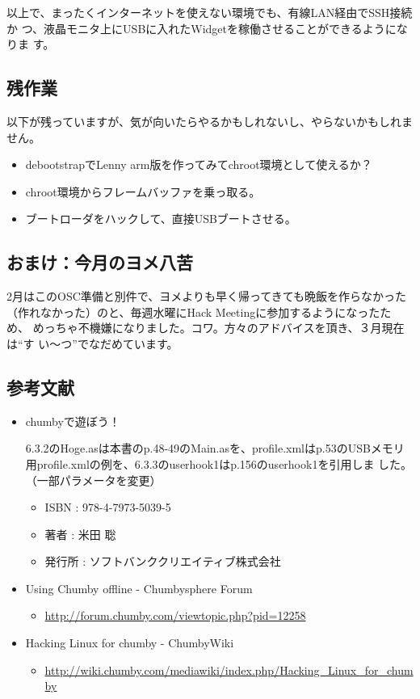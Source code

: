 \documentclass[mingoth,a4paper]{jsarticle}
\begin{document}
\begin{multicols}{2}
以上で、まったくインターネットを使えない環境でも、有線LAN経由でSSH接続か
つ、液晶モニタ上にUSBに入れたWidgetを稼働させることができるようになりま
す。
\subsection{残作業}
以下が残っていますが、気が向いたらやるかもしれないし、やらないかもしれません。
\begin{itemize}
\item debootstrapでLenny arm版を作ってみてchroot環境として使えるか？
\item chroot環境からフレームバッファを乗っ取る。
\item ブートローダをハックして、直接USBブートさせる。
\end{itemize}
\subsection{おまけ：今月のヨメ八苦}
2月はこのOSC準備と別件で、ヨメよりも早く帰ってきても晩飯を作らなかった
（作れなかった）のと、毎週水曜にHack Meetingに参加するようになったため、
めっちゃ不機嫌になりました。コワ。方々のアドバイスを頂き、３月現在は``す
い〜つ''でなだめています。

\subsection{参考文献}
\begin{itemize}
\item chumbyで遊ぼう！

6.3.2のHoge.asは本書のp.48-49のMain.asを、profile.xmlはp.53のUSBメモリ
      用profile.xmlの例を、6.3.3のuserhook1はp.156のuserhook1を引用しま
      した。（一部パラメータを変更）

\begin{itemize}
\item ISBN : 978-4-7973-5039-5
\item 著者 : 米田 聡
\item 発行所 : ソフトバンククリエイティブ株式会社
\end{itemize}
\item Using Chumby offline  - Chumbysphere Forum
\begin{itemize}
\item \url{http://forum.chumby.com/viewtopic.php?pid=12258}
\end{itemize}
\item Hacking Linux for chumby - ChumbyWiki
\begin{itemize}
\item \url{http://wiki.chumby.com/mediawiki/index.php/Hacking_Linux_for_chumby}
\end{itemize}
\end{itemize}
\end{multicols}
\end{document}
